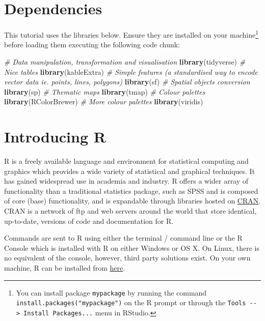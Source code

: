 \documentclass[]{book}
\newenvironment{Shaded}{\begin{snugshade}}{\end{snugshade}}
\newcommand{\KeywordTok}[1]{\textcolor[rgb]{0.13,0.29,0.53}{\textbf{#1}}}
\newcommand{\CommentTok}[1]{\textcolor[rgb]{0.56,0.35,0.01}{\textit{#1}}}
\newcommand{\NormalTok}[1]{#1}
\begin{document}
\section{Dependencies}\label{dependencies}

This tutorial uses the libraries below. Ensure they are installed on
your machine\footnote{You can install package \texttt{mypackage} by
  running the command \texttt{install.packages("mypackage")} on the R
  prompt or through the
  \texttt{Tools\ -\/-\textgreater{}\ Install\ Packages...} menu in
  RStudio.} before loading them executing the following code chunk:

\begin{Shaded}
\begin{Highlighting}[]
\CommentTok{# Data manipulation, transformation and visualisation}
\KeywordTok{library}\NormalTok{(tidyverse)}
\CommentTok{# Nice tables}
\KeywordTok{library}\NormalTok{(kableExtra)}
\CommentTok{# Simple features (a standardised way to encode vector data ie. points, lines, polygons)}
\KeywordTok{library}\NormalTok{(sf) }
\CommentTok{# Spatial objects conversion}
\KeywordTok{library}\NormalTok{(sp) }
\CommentTok{# Thematic maps}
\KeywordTok{library}\NormalTok{(tmap) }
\CommentTok{# Colour palettes}
\KeywordTok{library}\NormalTok{(RColorBrewer) }
\CommentTok{# More colour palettes}
\KeywordTok{library}\NormalTok{(viridis)}
\end{Highlighting}
\end{Shaded}

\section{Introducing R}\label{introducing-r}

R is a freely available language and environment for statistical
computing and graphics which provides a wide variety of statistical and
graphical techniques. It has gained widespread use in academia and
industry. R offers a wider array of functionality than a traditional
statistics package, such as SPSS and is composed of core (base)
functionality, and is expandable through libraries hosted on
\href{https://cran.r-project.org}{CRAN}. CRAN is a network of ftp and
web servers around the world that store identical, up-to-date, versions
of code and documentation for R.

Commands are sent to R using either the terminal / command line or the R
Console which is installed with R on either Windows or OS X. On Linux,
there is no equivalent of the console, however, third party solutions
exist. On your own machine, R can be installed from
\href{https://www.r-project.org/}{here}.
\end{document}
